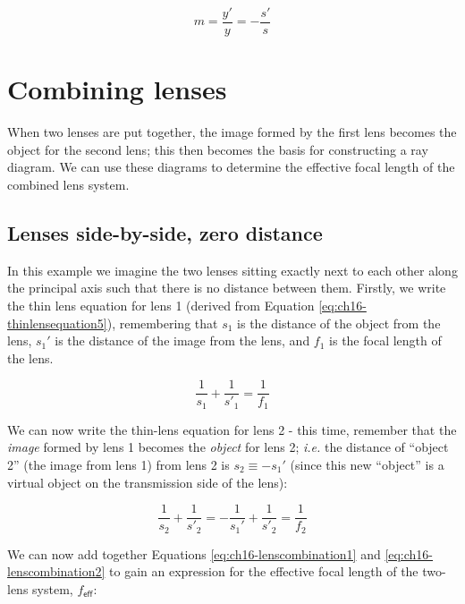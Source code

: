 \documentclass[
]{book}
\begin{document}
\begin{equation}
m = \frac{y'}{y} = -\frac{s'}{s}
\end{equation}

\hypertarget{sec:ch16-lenscombination1}{%
\section{Combining lenses}\label{sec:ch16-lenscombination1}}

When two lenses are put together, the image formed by the first lens becomes the object for the second lens; this then becomes the basis for constructing a ray diagram. We can use these diagrams to determine the effective focal length of the combined lens system.

\hypertarget{sec:ch16-2lenszerodistance}{%
\subsection{Lenses side-by-side, zero distance}\label{sec:ch16-2lenszerodistance}}

In this example we imagine the two lenses sitting exactly next to each other along the principal axis such that there is no distance between them. Firstly, we write the thin lens equation for lens 1 (derived from Equation \eqref{eq:ch16-thinlensequation5}), remembering that \(s_1\) is the distance of the object from the lens, \(s_1'\) is the distance of the image from the lens, and \(f_1\) is the focal length of the lens.

\begin{equation}
\frac{1}{s_1} + \frac{1}{s'_1} = \frac{1}{f_1}
\label{eq:ch16-lenscombination1}
\end{equation}

We can now write the thin-lens equation for lens 2 - this time, remember that the \emph{image} formed by lens 1 becomes the \emph{object} for lens 2; \emph{i.e.} the distance of ``object 2'' (the image from lens 1) from lens 2 is \(s_2 \equiv - s_1'\) (since this new ``object'' is a virtual object on the transmission side of the lens):

\begin{equation}
\frac{1}{s_2} + \frac{1}{s'_2} = -\frac{1}{s_1'} + \frac{1}{s'_2}= \frac{1}{f_2}
\label{eq:ch16-lenscombination2}
\end{equation}

We can now add together Equations \eqref{eq:ch16-lenscombination1} and \eqref{eq:ch16-lenscombination2} to gain an expression for the effective focal length of the two-lens system, \(f_{\textsf{eff}}\):
\end{document}
